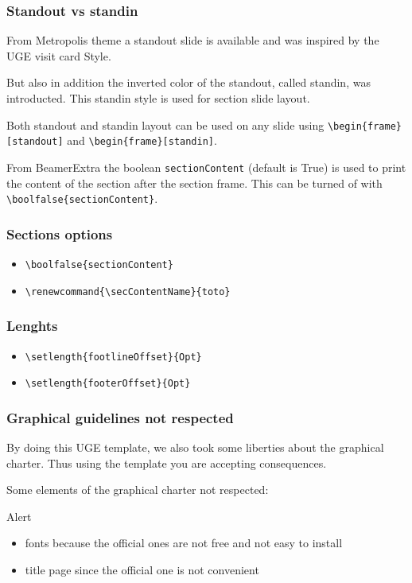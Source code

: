 	\begin{frame}
		\frametitle{Standout vs standin}

		From Metropolis theme a standout slide is available and was inspired by the UGE visit card Style.
		
		But also in addition the inverted color of the standout, called standin, was introducted.
		This standin style is used for section slide layout.
		
		Both standout and standin layout can be used on any slide using 
		\verb|\begin{frame}[standout]| and \verb|\begin{frame}[standin]|.

		From BeamerExtra the boolean \verb|sectionContent| (default is True) is used to print the content of the section after the section frame. 
		This can be turned of with \verb|\boolfalse{sectionContent}|.
	\end{frame}


	\begin{frame}[fragile]
		\frametitle{Sections options}

		\begin{itemize}
			\item \verb|\boolfalse{sectionContent}|
			\item \verb|\renewcommand{\secContentName}{toto}|
		\end{itemize}
	\end{frame}


	\begin{frame}[fragile]
		\frametitle{Lenghts}

		\begin{itemize}
			\item \verb|\setlength{footlineOffset}{Opt}|
			\item \verb|\setlength{footerOffset}{Opt}|
		\end{itemize}
	\end{frame}


	\begin{frame}
		\frametitle{Graphical guidelines not respected}

		By doing this UGE template, we also took some liberties about the graphical charter.
		Thus using the template you are accepting consequences.
		\bigskip
		
		Some elements of the graphical charter not respected:
		\begin{alertblock}{Alert}
			\begin{itemize}
			 	\item fonts because the official ones are not free and not easy to install
			 	\item title page since the official one is not convenient
			\end{itemize}
	   \end{alertblock}
	\end{frame}


